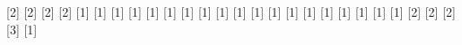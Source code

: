 \newtextcommand{\diamondsuit}
\newtextcommand{\partial}
\newtextcommand{\qed}
\newtextcommand{\mod}
\newtextcommand{\pmod}
\newtextcommand{\bottom}
\newtextcommand{\neg}
\newtextcommand{\neq}
\newtextcommand{\ne}
\newtextcommand{\shortmid}
\newtextcommand{\mid}
\newtextcommand{\int}
\newtextcommand{\integral}
\newtextcommand{\iint}
\newtextcommand{\doubleintegral}
\newtextcommand{\iiint}
\newtextcommand{\tripleintegral}
\newtextcommand{\iiiint}
\newtextcommand{\quadrupleintegral}
\newtextcommand{\oint}
\newtextcommand{\conint}
\newtextcommand{\contourintegral}
\newtextcommand{\times}
\newtextcommand{\star}
\newtextcommand{\circleddash}
\newtextcommand{\odash}
\newtextcommand{\intercal}
\newtextcommand{\smallfrown}
\newtextcommand{\smallsmile}
\newtextcommand{\boxminus}
\newtextcommand{\minusb}
\newtextcommand{\boxplus}
\newtextcommand{\plusb}
\newtextcommand{\boxtimes}
\newtextcommand{\timesb}
\newtextcommand{\sum}
\newtextcommand{\prod}
\newtextcommand{\product}
\newtextcommand{\coprod}
\newtextcommand{\coproduct}
\newtextcommand{\otimes}
\newtextcommand{\Otimes}
\newtextcommand{\bigotimes}
\newtextcommand{\ominus}
\newtextcommand{\oslash}
\newtextcommand{\oplus}
\newtextcommand{\Oplus}
\newtextcommand{\bigoplus}
\newtextcommand{\bigodot}
\newtextcommand{\bigsqcup}
\newtextcommand{\biguplus}
\newtextcommand{\wedge}
\newtextcommand{\Wedge}
\newtextcommand{\bigwedge}
\newtextcommand{\Vee}
\newtextcommand{\bigvee}
\newtextcommand{\invamp}
\newtextcommand{\parr}
\newtextcommand{\frac}[2]
\newtextcommand{\tfrac}[2]
\newtextcommand{\binom}[2]
\newtextcommand{\tbinom}[2]
\newtextcommand{\tensor}
\newtextcommand{\multiscripts}
\newtextcommand{\overbrace}[1]
\newtextcommand{\underbrace}[1]
\newtextcommand{\underline}[1]
\newtextcommand{\bar}[1]
\newtextcommand{\overline}[1]
\newtextcommand{\closure}[1]
\newtextcommand{\widebar}[1]
\newtextcommand{\vec}[1]
\newtextcommand{\widevec}[1]
\newtextcommand{\dot}[1]
\newtextcommand{\ddot}[1]
\newtextcommand{\dddot}[1]
\newtextcommand{\ddddot}[1]
\newtextcommand{\tilde}[1]
\newtextcommand{\widetilde}[1]
\newtextcommand{\check}[1]
\newtextcommand{\widecheck}[1]
\newtextcommand{\hat}[1]
\newtextcommand{\widehat}[1]
\newtextcommand{\underset}[2]
\newtextcommand{\stackrel}[2]
\newtextcommand{\overset}[2]
\newtextcommand{\over}
\newtextcommand{\atop}
\newtextcommand{\underoverset}[3]
\newtextcommand{\sqrt}[1]
\newtextcommand{\root}
\newtextcommand{\statusline}
\newtextcommand{\tooltip}
\newtextcommand{\toggle}
\newtextcommand{\fghilight}
\newtextcommand{\fghighlight}
\newtextcommand{\bghilight}
\newtextcommand{\bghighlight}
